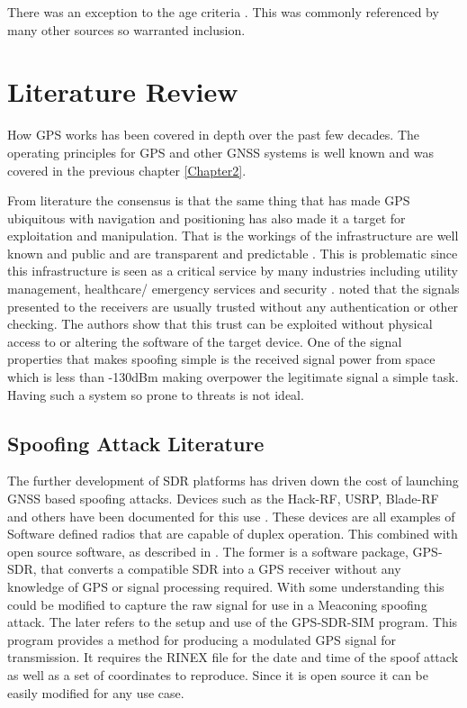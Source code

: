 There was an exception to the age criteria \cite{RN11}. This was commonly referenced by many other sources so warranted inclusion. 


\section{Literature Review}
How GPS works has been covered in depth over the past few decades. The operating principles for GPS and other GNSS systems is well known and was covered in the previous
chapter \ref{Chapter2}.

From literature the consensus is that the same thing that has made GPS ubiquitous with navigation and 
positioning has also made it a target for exploitation and manipulation. That is the workings
of the infrastructure are well known and public and are transparent and predictable \cite{RN7} \cite{RN4}. This is problematic since this infrastructure
is seen as a critical service by many industries including utility management, healthcare/ emergency services and security \cite{RN12} \cite{RN32}. \textcite{RN28} noted that the signals
presented to the receivers are usually trusted without any authentication or other checking. The authors show that this trust can be exploited without physical access to
or altering the software of the target device. One of the signal properties that makes spoofing simple is the received signal power from space which is less than -130dBm
making overpower the legitimate signal a simple task. Having such a system so prone to threats is not ideal. 

%
%

\subsection{Spoofing Attack Literature} \label{Subsec:SpoofLit}
The further development of SDR platforms has driven down the cost of launching GNSS based spoofing attacks. Devices such as the Hack-RF, USRP, Blade-RF and others have
been documented for this use \cite{RN4} \cite{RN9}. These devices are all examples of Software defined radios that are capable of duplex operation. This combined with
open source software, as described in \cite{RN16} \cite{RN57} \cite{RN4}. The former is a software package, GPS-SDR, that converts a compatible SDR into a GPS receiver
without any knowledge of GPS or signal processing required. With some understanding this could be modified to capture the raw signal for use in a Meaconing spoofing
attack. The later refers to the setup and use of the GPS-SDR-SIM program. This program provides a method for producing a modulated GPS signal for transmission. It
requires the RINEX file for the date and time of the spoof attack as well as a set of coordinates to reproduce. Since it is open source it can be easily modified for any
use case. 

